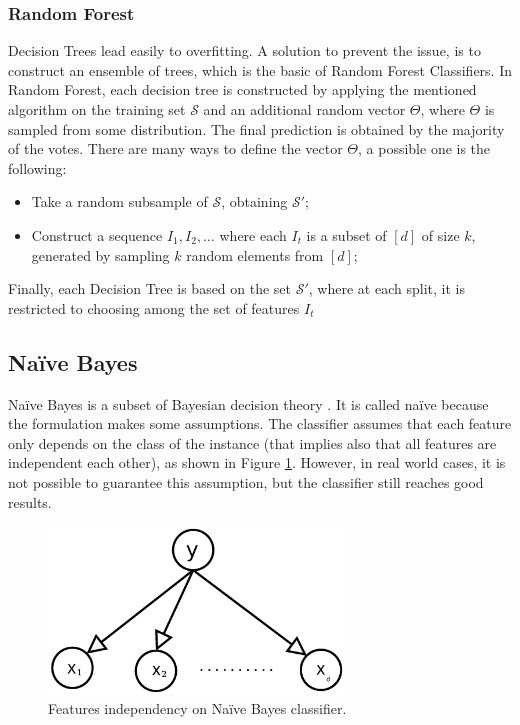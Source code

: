 \subsubsection{Random Forest}
Decision Trees lead easily to overfitting. A solution to prevent the issue, is to construct an ensemble of trees, which is the basic of Random Forest Classifiers. In Random Forest, each decision tree is constructed by applying the mentioned algorithm on the training set $\mathcal{S}$ and an additional random vector $\Theta$, where $\Theta$ is sampled from some distribution. The final prediction is obtained by the majority of the votes. There are many ways to define the vector $\Theta$, a possible one is the following:
\begin{itemize}
	\item Take a random subsample of $\mathcal{S}$, obtaining $\mathcal{S}'$;
	\item Construct a sequence $I_1, I_2, \dots$ where each $I_t$ is a subset of $[d]$ of size $k$, generated by sampling $k$ random elements from $[d]$;
\end{itemize}
Finally, each Decision Tree is based on the set $\mathcal{S}'$, where at each split, it is restricted to choosing among the set of features $I_t$



\subsection{Na{\"i}ve Bayes}

Na{\"i}ve Bayes is a subset of Bayesian decision theory \cite{Taheri:2013:LNB:3062637.3062651}. It is called na{\"i}ve because the formulation makes some assumptions. The classifier assumes that each feature only depends on the class of the instance (that implies also that all features are independent each other), as shown in Figure \ref{fig:naive-bayes}. However, in real world cases, it is not possible to guarantee this assumption, but the classifier still reaches good results.\\

\begin{figure}[ht]
	\centering
	\includegraphics[width=0.7\textwidth]{figures/naive-bayes.png}
	\caption{Features independency on Na{\"i}ve Bayes classifier.}
	\label{fig:naive-bayes}
\end{figure}

